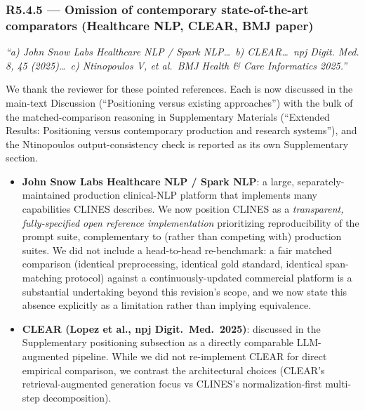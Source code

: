 \documentclass[11pt,letterpaper]{article}
\newcommand{\reviewer}[1]{\par\medskip\textcolor{blue!75!black}{\textit{#1}}\par\medskip}
\newcommand{\response}[1]{\par#1\par\medskip}
\begin{document}
\subsubsection*{R5.4.5 --- Omission of contemporary state-of-the-art comparators (Healthcare NLP, CLEAR, BMJ paper)}
\reviewer{``a) John Snow Labs Healthcare NLP / Spark NLP\dots\ b) CLEAR\dots\ npj Digit. Med. 8, 45 (2025)\dots\ c) Ntinopoulos V, et al.\ BMJ Health \& Care Informatics 2025.''}
\response{We thank the reviewer for these pointed references. Each is now discussed in the main-text Discussion (``Positioning versus existing approaches'') with the bulk of the matched-comparison reasoning in Supplementary Materials (``Extended Results: Positioning versus contemporary production and research systems''), and the Ntinopoulos output-consistency check is reported as its own Supplementary section.
\begin{itemize}[leftmargin=*]
    \item \textbf{John Snow Labs Healthcare NLP / Spark NLP}: a large, separately-maintained production clinical-NLP platform that implements many capabilities CLINES describes. We now position CLINES as a \emph{transparent, fully-specified open reference implementation} prioritizing reproducibility of the prompt suite, complementary to (rather than competing with) production suites. We did not include a head-to-head re-benchmark: a fair matched comparison (identical preprocessing, identical gold standard, identical span-matching protocol) against a continuously-updated commercial platform is a substantial undertaking beyond this revision's scope, and we now state this absence explicitly as a limitation rather than implying equivalence.
    \item \textbf{CLEAR (Lopez et al., npj Digit.\ Med.\ 2025)}: discussed in the Supplementary positioning subsection as a directly comparable LLM-augmented pipeline. While we did not re-implement CLEAR for direct empirical comparison, we contrast the architectural choices (CLEAR's retrieval-augmented generation focus vs CLINES's normalization-first multi-step decomposition).

\end{itemize}}
\end{document}
